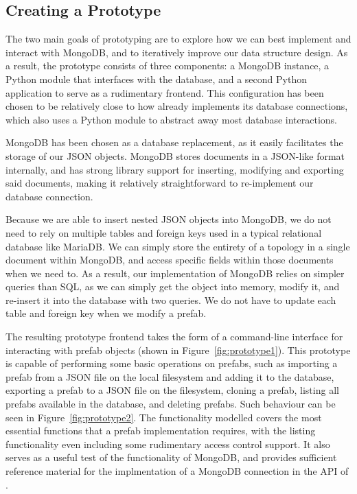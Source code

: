 \documentclass[11pt]{article}
\begin{document}
	
	\subsection{Creating a Prototype}
		The two main goals of prototyping are to explore how we can best implement and interact with MongoDB, and to iteratively improve our data structure design.
		As a result, the prototype consists of three components: a MongoDB instance, a Python module that interfaces with the database, and a second Python application to serve as a rudimentary frontend. 
		This configuration has been chosen to be relatively close to how \opendc{} already implements its database connections, which also uses a Python module to abstract away most database interactions.

		MongoDB has been chosen as a database replacement, as it easily facilitates the storage of our JSON objects.
		MongoDB stores documents in a JSON-like format internally, and has strong library support for inserting, modifying and exporting said documents, making it relatively straightforward to re-implement our database connection.

		Because we are able to insert nested JSON objects into MongoDB, we do not need to rely on multiple tables and foreign keys used in a typical relational database like MariaDB.
		We can simply store the entirety of a topology in a single document within MongoDB, and access specific fields within those documents when we need to.
		As a result, our implementation of MongoDB relies on simpler queries than SQL, as we can simply get the object into memory, modify it, and re-insert it into the database with two queries.
		We do not have to update each table and foreign key when we modify a prefab.

		The resulting prototype frontend takes the form of a command-line interface for interacting with prefab objects (shown in Figure~\ref{fig:prototype1}).
		This prototype is capable of performing some basic operations on prefabs, such as importing a prefab from a JSON file on the local filesystem and adding it to the database, exporting a prefab to a JSON file on the filesystem, cloning a prefab, listing all prefabs available in the database, and deleting prefabs.
		Such behaviour can be seen in Figure~\ref{fig:prototype2}.
		The functionality modelled covers the most essential functions that a prefab implementation requires, with the listing functionality even including some rudimentary access control support.
		It also serves as a useful test of the functionality of MongoDB, and provides sufficient reference material for the implmentation of a MongoDB connection in the API of \opendc{}.
\end{document}
